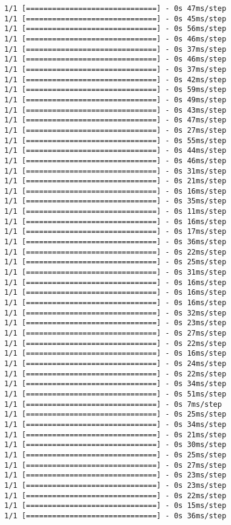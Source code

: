 \documentclass[11pt]{article}
\begin{document}
\begin{Verbatim}[commandchars=\\\{\}]
1/1 [==============================] - 0s 47ms/step
1/1 [==============================] - 0s 45ms/step
1/1 [==============================] - 0s 56ms/step
1/1 [==============================] - 0s 46ms/step
1/1 [==============================] - 0s 37ms/step
1/1 [==============================] - 0s 46ms/step
1/1 [==============================] - 0s 37ms/step
1/1 [==============================] - 0s 42ms/step
1/1 [==============================] - 0s 59ms/step
1/1 [==============================] - 0s 49ms/step
1/1 [==============================] - 0s 43ms/step
1/1 [==============================] - 0s 47ms/step
1/1 [==============================] - 0s 27ms/step
1/1 [==============================] - 0s 55ms/step
1/1 [==============================] - 0s 44ms/step
1/1 [==============================] - 0s 46ms/step
1/1 [==============================] - 0s 31ms/step
1/1 [==============================] - 0s 21ms/step
1/1 [==============================] - 0s 16ms/step
1/1 [==============================] - 0s 35ms/step
1/1 [==============================] - 0s 11ms/step
1/1 [==============================] - 0s 16ms/step
1/1 [==============================] - 0s 17ms/step
1/1 [==============================] - 0s 36ms/step
1/1 [==============================] - 0s 22ms/step
1/1 [==============================] - 0s 25ms/step
1/1 [==============================] - 0s 31ms/step
1/1 [==============================] - 0s 16ms/step
1/1 [==============================] - 0s 16ms/step
1/1 [==============================] - 0s 16ms/step
1/1 [==============================] - 0s 32ms/step
1/1 [==============================] - 0s 23ms/step
1/1 [==============================] - 0s 27ms/step
1/1 [==============================] - 0s 22ms/step
1/1 [==============================] - 0s 16ms/step
1/1 [==============================] - 0s 24ms/step
1/1 [==============================] - 0s 22ms/step
1/1 [==============================] - 0s 34ms/step
1/1 [==============================] - 0s 51ms/step
1/1 [==============================] - 0s 7ms/step
1/1 [==============================] - 0s 25ms/step
1/1 [==============================] - 0s 34ms/step
1/1 [==============================] - 0s 21ms/step
1/1 [==============================] - 0s 30ms/step
1/1 [==============================] - 0s 25ms/step
1/1 [==============================] - 0s 27ms/step
1/1 [==============================] - 0s 23ms/step
1/1 [==============================] - 0s 23ms/step
1/1 [==============================] - 0s 22ms/step
1/1 [==============================] - 0s 15ms/step
1/1 [==============================] - 0s 36ms/step

\end{Verbatim}
\end{document}
